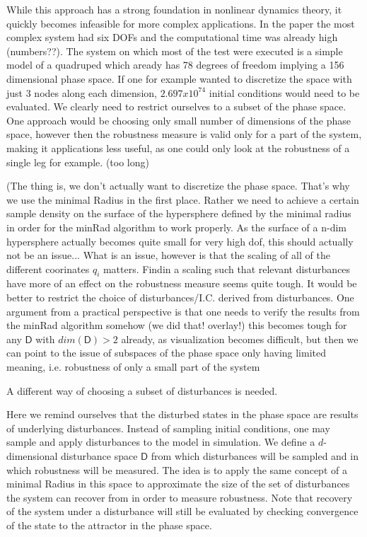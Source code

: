     While this approach has a strong foundation in nonlinear dynamics theory, it quickly becomes infeasible for more complex applications. In the paper the most complex system had six DOFs and the computational time was already high (numbers??). 
    The system on which most of the test were executed is a simple model of a quadruped which aready has 78 degrees of freedom implying a 156 dimensional phase space. If one for example wanted to discretize the space with just 3 nodes along each dimension, $2.697x10^74$ initial conditions would need to be evaluated. We clearly need to restrict ourselves to a subset of the phase space. One approach would be choosing only small number of dimensions of the phase space, however then the robustness measure is valid only for a part of the system, making it applications less useful, as one could only look at the robustness of a single leg for example. (too long)

    (The thing is, we don't actually want to discretize the phase space. That's why we use the minimal Radius in the first place. Rather we need to achieve a certain sample density on the surface of the hypersphere defined by the minimal radius in order for the minRad algorithm to work properly. As the surface of a n-dim hypersphere actually becomes quite small for very high dof, this should actually not be an issue... What is an issue, however is that the scaling of all of the different coorinates $q_i$ matters. Findin a scaling such that relevant disturbances have more of an effect on the robustness measure seems quite tough. It would be better to restrict the choice of disturbances/I.C. derived from disturbances. 
    One argument from a practical perspective is that one needs to verify the results from the minRad algorithm somehow (we did that! overlay!) this becomes tough for any $\mathsf{D}$ with $dim(\mathsf{D}) > 2$ already, as visualization becomes difficult, but then we can point to the issue of subspaces of the phase space only having limited meaning, i.e. robustness of only a small part of the system 

    A different way of choosing a subset of disturbances is needed. 
    
    Here we remind ourselves that the disturbed states in the phase space are results of underlying disturbances. Instead of sampling initial conditions, one may sample and apply disturbances to the model in simulation. We define a $d$-dimensional disturbance space $\mathsf{D}$ from which disturbances will be sampled and in which robustness will be measured. The idea is to apply the same concept of a minimal Radius in this space to approximate the size of the set of disturbances the system can recover from in order to measure robustness. Note that recovery of the system under a disturbance will still be evaluated by checking convergence of the state to the attractor in the phase space. 

